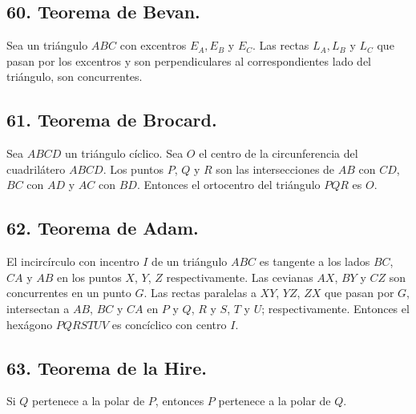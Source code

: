 \documentclass[12pt,a4paper]{article}
\begin{document}
\subsection*{60. Teorema de Bevan.}
Sea un triángulo $ABC$ con excentros $E_A, E_B$ y $E_C$. Las rectas $L_A, L_B$ y $L_C$ que pasan por los excentros y son perpendiculares al correspondientes lado del triángulo, son concurrentes.
\subsection*{61. Teorema de Brocard.}
Sea $ABCD$ un triángulo cíclico. Sea $O$ el centro de la circunferencia del cuadrilátero $ABCD$. Los puntos $P$, $Q$ y $R$ son las intersecciones de $AB$ con $CD$, $BC$ con $AD$ y $AC$ con $BD$. Entonces el ortocentro del triángulo $PQR$ es $O$. 
\subsection*{62. Teorema de Adam.}
El incircírculo con incentro $I$ de un triángulo $ABC$ es tangente a los lados $BC$, $CA$ y $AB$ en los puntos $X$, $Y$, $Z$ respectivamente. Las cevianas  $AX$, $BY$ y $CZ$ son concurrentes en un punto $G.$ Las rectas paralelas a $XY$, $YZ$, $ZX$ que pasan por $G$, intersectan a $AB$, $BC$ y $CA$ en $P$ y $Q$, $R$ y $S$, $T$ y $U$; respectivamente. Entonces el hexágono $PQRSTUV$ es concíclico con centro $I$.
\subsection*{63. Teorema de la Hire.}
Si $Q$ pertenece a la polar de $P$, entonces $P$ pertenece a la polar de $Q$.
\end{document}
